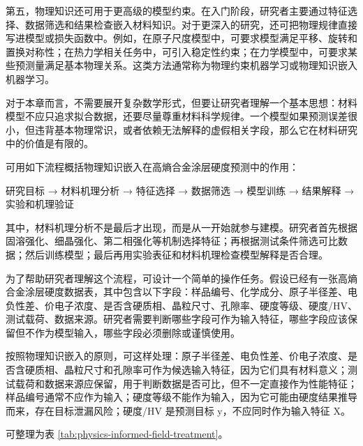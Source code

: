 第五，物理知识还可用于更高级的模型约束。在入门阶段，研究者主要通过特征选择、数据筛选和结果检查嵌入材料知识。对于更深入的研究，还可把物理规律直接写进模型或损失函数中。例如，在原子尺度模型中，可要求模型满足平移、旋转和置换对称性；在热力学相关任务中，可引入稳定性约束；在力学模型中，可要求某些预测量满足基本物理关系。这类方法通常称为物理约束机器学习或物理知识嵌入机器学习。


对于本章而言，不需要展开复杂数学形式，但要让研究者理解一个基本思想：材料模型不应只追求拟合数据，还要尽量尊重材料科学规律。一个模型如果预测误差很小，但违背基本物理常识，或者依赖无法解释的虚假相关字段，那么它在材料研究中的价值是有限的。


可用如下流程概括物理知识嵌入在高熵合金涂层硬度预测中的作用：


\begin{lightquote}
\centering 研究目标 → 材料机理分析 → 特征选择 → 数据筛选 → 模型训练 → 结果解释 → 实验和机理验证
\end{lightquote}

其中，材料机理分析不是最后才出现，而是从一开始就参与建模。研究者首先根据固溶强化、细晶强化、第二相强化等机制选择特征；再根据测试条件筛选可比数据；然后训练模型；最后再用实验表征和材料机理检查模型解释是否合理。


为了帮助研究者理解这个流程，可设计一个简单的操作任务。假设已经有一张高熵合金涂层硬度数据表，其中包含以下字段：样品编号、化学成分、原子半径差、电负性差、价电子浓度、是否含硬质相、晶粒尺寸、孔隙率、硬度等级、硬度/HV、测试载荷、数据来源。研究者需要判断哪些字段可作为输入特征，哪些字段应该保留但不作为模型输入，哪些字段必须删除或谨慎使用。


按照物理知识嵌入的原则，可这样处理：原子半径差、电负性差、价电子浓度、是否含硬质相、晶粒尺寸和孔隙率可作为候选输入特征，因为它们具有材料意义；测试载荷和数据来源应保留，用于判断数据是否可比，但不一定直接作为性能特征；样品编号通常不应作为输入；硬度等级不能作为输入，因为它可能由硬度结果推导而来，存在目标泄漏风险；硬度/HV 是预测目标 y，不应同时作为输入特征 X。


可整理为表 \ref{tab:physics-informed-field-treatment}。


